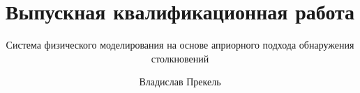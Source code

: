 \documentclass[xetex,aspectratio=43]{beamer}
\title{Выпускная квалификационная работа}
\subtitle{Система физического моделирования на основе априорного подхода обнаружения столкновений}
\author{Владислав Прекель}
\institute{ИКИТ СФУ\par КИ18-16б}
\date{Красноярск\par 20 июня 2022 г.}
\newenvironment{Underequation}{
    \small
    \noindent
    где
    \hspace{-1.45ex}
    \setlength{\parindent}{3.5ex}
}{}
\begin{document}
\begin{frame}
    \titlepage
\end{frame}
















\end{document}
